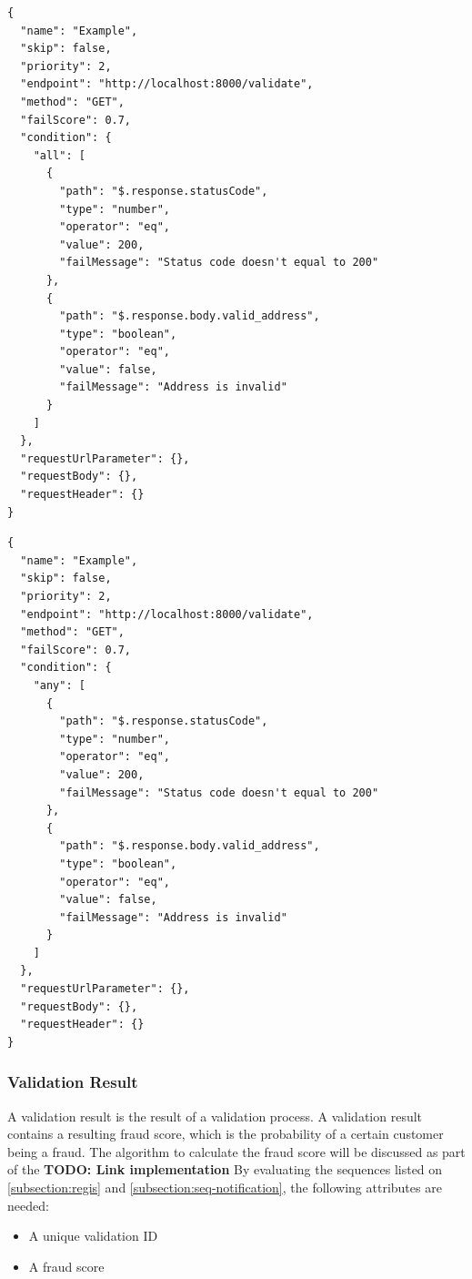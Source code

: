 \begin{lstlisting}[caption={Validation rule example with ALL conditions (JSON)}]
{
  "name": "Example",
  "skip": false,
  "priority": 2,
  "endpoint": "http://localhost:8000/validate",
  "method": "GET",
  "failScore": 0.7,
  "condition": {
    "all": [
      {
        "path": "$.response.statusCode",
        "type": "number",
        "operator": "eq",
        "value": 200,
        "failMessage": "Status code doesn't equal to 200"
      },
      {
        "path": "$.response.body.valid_address",
        "type": "boolean",
        "operator": "eq",
        "value": false,
        "failMessage": "Address is invalid"
      }
    ]
  },
  "requestUrlParameter": {},
  "requestBody": {},
  "requestHeader": {}
}
\end{lstlisting}

\begin{lstlisting}[caption={Validation rule example with ANY conditions (JSON)}]
{
  "name": "Example",
  "skip": false,
  "priority": 2,
  "endpoint": "http://localhost:8000/validate",
  "method": "GET",
  "failScore": 0.7,
  "condition": {
    "any": [
      {
        "path": "$.response.statusCode",
        "type": "number",
        "operator": "eq",
        "value": 200,
        "failMessage": "Status code doesn't equal to 200"
      },
      {
        "path": "$.response.body.valid_address",
        "type": "boolean",
        "operator": "eq",
        "value": false,
        "failMessage": "Address is invalid"
      }
    ]
  },
  "requestUrlParameter": {},
  "requestBody": {},
  "requestHeader": {}
}
\end{lstlisting}

\subsubsection{Validation Result}

A validation result is the result of a validation process. A validation result contains a resulting fraud score, which is the probability of a certain customer being a fraud. The algorithm to calculate the fraud score will be discussed as part of the \textbf{TODO: Link implementation}
By evaluating the sequences listed on \autoref{subsection:regis} and \autoref{subsection:seq-notification}, the following attributes are needed:

\begin{itemize}
  \item A unique validation ID
  \item A fraud score 
\end{itemize}

